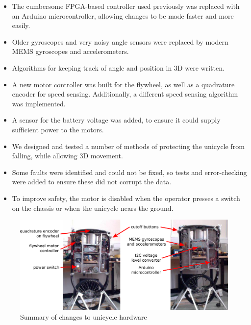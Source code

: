 \documentclass{IIBproject}
\begin{document}
\begin{itemize}

  \item The cumbersome FPGA-based controller used previously was replaced with
    an Arduino microcontroller, allowing changes to be made faster and more
    easily.

  \item Older gyroscopes and very noisy angle sensors were replaced by modern
    MEMS gyroscopes and accelerometers.

  \item Algorithms for keeping track of angle and position in 3D were written.

  \item A new motor controller was built for the flywheel, as well as a
    quadrature encoder for speed sensing. Additionally, a different speed
    sensing algorithm was implemented.

  \item A sensor for the battery voltage was added, to ensure it could supply
    sufficient power to the motors.

  \item We designed and tested a number of methods of protecting the unicycle
    from falling, while allowing 3D movement.

  \item Some faults were identified and could not be fixed, so tests and
    error-checking were added to ensure these did not corrupt the data.

  \item To improve safety, the motor is disabled when the operator presses a
    switch on the chassis or when the unicycle nears the ground.

\end{itemize}

\begin{figure}[htpb]
  \begin{center}
    \includegraphics[width=15cm]{figures/hardware.pdf}
    \end{center}
    \caption{Summary of changes to unicycle hardware}
    \label{fig:hardware}
    \end{figure}
\end{document}
